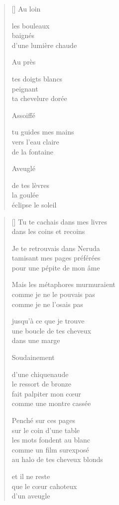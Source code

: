 \documentclass[12pt,a4paper]{article}
\begin{document}
\begin{verse}[\versewidth]
  Au loin

  les bouleaux \\
  baignés \\
  d'une lumière chaude

  Au près

  tes doigts blancs \\
  peignant \\
  ta chevelure dorée

  Assoiffé

  tu guides mes mains \\
  vers l'eau claire \\
  de la fontaine

  Aveuglé

  de tes lèvres \\
  la goulée \\
  éclipse le soleil
\end{verse}


\newpage

\poemtitle{}

\settowidth{\versewidth}{Mais les métaphores murmuraient}

\bigskip

\begin{verse}[\versewidth]
  Tu te cachais dans mes livres \\
  dans les coins et recoins

  Je te retrouvais dans Neruda \\
  tamisant mes pages préférées \\
  pour une pépite de mon âme

  Mais les métaphores murmuraient \\
  comme je ne le pouvais pas \\
  comme je ne l'osais pas

  jusqu'à ce que je trouve \\
  une boucle de tes cheveux \\
  dans une marge

  Soudainement

  d'une chiquenaude \\
  le ressort de bronze \\
  fait palpiter mon cœur \\
  comme une montre cassée

  Penché sur ces pages \\
  sur le coin d'une table \\
  les mots fondent au blanc \\
  comme un film surexposé \\
  au halo de tes cheveux blonds

  et il ne reste \\
  que le cœur cahoteux \\
  d'un aveugle
\end{verse}
\end{document}
